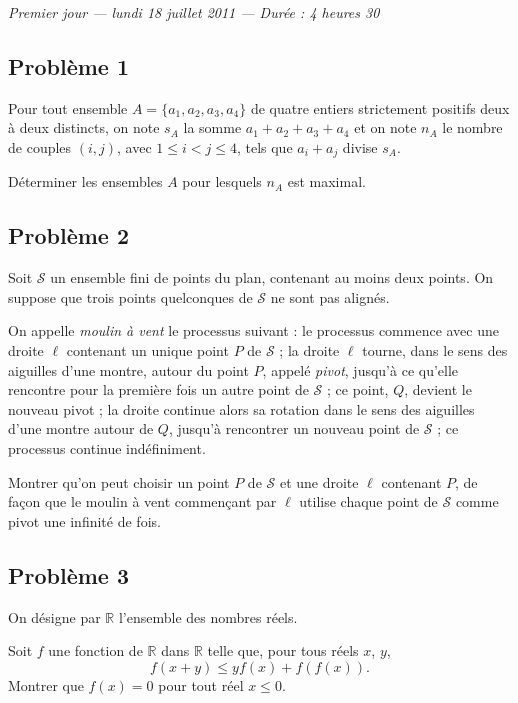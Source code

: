 
\begin{center}
  \emph{Premier jour --- lundi 18 juillet 2011 --- Durée : 4 heures 30}
\end{center}

\subsection*{Problème 1}
Pour tout ensemble $A = \{a_1, a_2, a_3, a_4\}$ de quatre entiers strictement positifs deux à deux distincts,
on note $s_A$ la somme $a_1 + a_2 + a_3 + a_4$ et on note $n_A$ le nombre de couples $(i, j)$, avec
$1 \leqslant i < j \leqslant 4$, tels que $a_i + a_j$ divise $s_A$.

Déterminer les ensembles $A$ pour lesquels $n_A$ est maximal.

\subsection*{Problème 2}
Soit $\mathcal{S}$ un ensemble fini de points du plan, contenant au moins deux points. On suppose que trois
points quelconques de $\mathcal{S}$ ne sont pas alignés.

On appelle \emph{moulin à vent} le processus suivant : le processus commence avec une droite $\ell$ contenant
un unique point $P$ de $\mathcal{S}$ ; la droite $\ell$ tourne, dans le sens des aiguilles d'une montre, autour
du point $P$, appelé \emph{pivot}, jusqu'à ce qu'elle rencontre pour la première fois un autre point de
$\mathcal{S}$ ; ce point, $Q$, devient le nouveau pivot ; la droite continue alors sa rotation dans le sens des
aiguilles d'une montre autour de $Q$, jusqu'à rencontrer un nouveau point de $\mathcal{S}$ ; ce processus
continue indéfiniment.

Montrer qu'on peut choisir un point $P$ de $\mathcal{S}$ et une droite $\ell$ contenant $P$, de façon que le
moulin à vent commençant par $\ell$ utilise chaque point de $\mathcal{S}$ comme pivot une infinité de fois.

\subsection*{Problème 3}
On désigne par $\mathbb{R}$ l'ensemble des nombres réels.

Soit $f$ une fonction de $\mathbb{R}$ dans $\mathbb{R}$ telle que, pour tous réels $x$, $y$,
\[
f(x + y) \leqslant yf(x) + f(f(x)).
\]
Montrer que $f(x) = 0$ pour tout réel $x \leqslant 0$.

